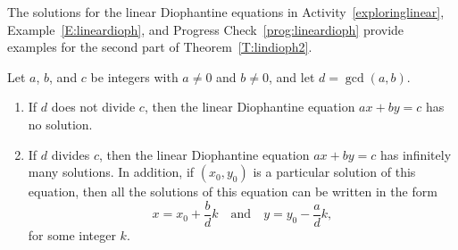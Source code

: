 The solutions for the linear Diophantine equations in \typeu Activity~\ref*{exploringlinear}, Example~\ref{E:lineardioph}, and Progress Check~\ref{prog:lineardioph} provide examples for the second part of Theorem~\ref{T:lindioph2}.
\begin{theorem} \label{T:lindioph2}
Let $a$, $b$, and $c$ be integers with $a \ne 0$ and $b \ne 0$, and let \linebreak 
$d = \gcd( a, b )$.
\begin{enumerate}
\item If $d$ does not divide $c$, then the linear Diophantine equation $ax + by = c$ has no solution.  \label{T:lindiop2-1}

\item If $d$ divides $c$, then the linear Diophantine equation $ax + by = c$ has infinitely many solutions.  In addition, if  $\left( x_0, y_0 \right)$ is a particular solution of this equation, then all the solutions of this equation can be written in the form
\[
x = x_0 + \frac{b}{d} k  \quad \text{and} \quad  y = y_0 - \frac{a}{d} k,
\]
for some integer  $k$.
\label{T:lindiop2-2}%
\end{enumerate}
\end{theorem}
%
\setcounter{equation}{0}
